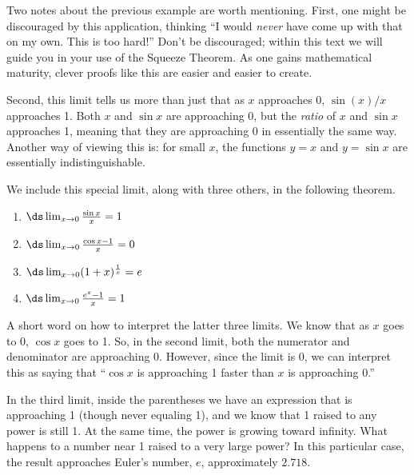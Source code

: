 Two notes about the previous example are worth mentioning. First, one might be discouraged by this application, thinking ``I would \emph{never} have come up with that on my own. This is too hard!'' Don't be discouraged; within this text we will guide you in your use of the Squeeze Theorem. As one gains mathematical maturity, clever proofs like this are easier and easier to create.

Second, this limit tells us more than just that as $x$ app\-roaches 0, $\sin(x)/x$ approaches 1. Both $x$ and $\sin x$ are approaching 0, but the \emph{ratio} of $x$ and $\sin x$ approaches 1, meaning that they are approaching 0 in essentially the same way. Another way of viewing this is: for small $x$, the functions $y=x$ and $y=\sin x$ are essentially indistinguishable.\bigskip

We include this special limit, along with three others, in the following theorem.

\begin{theorem}\label{thm:special_limits}
\mbox{}\vspace{-1.5\baselineskip}
\begin{multicols}{2}
\begin{enumerate}
	\item		$\ds \lim_{x\to 0} \frac{\sin x}{x} = 1$
	\item		$\ds \lim_{x\to 0} \frac{\cos x-1}{x} = 0$
	\item		$\ds \lim_{x\to 0} (1+x)^\frac1x = e$
	\item		$\ds \lim_{x\to 0} \frac{e^x-1}{x} = 1$
\end{enumerate}
\end{multicols}
\end{theorem}

A short word on how to interpret the latter three limits. We know that as $x$ goes to 0, $\cos x$ goes to 1. So, in the second limit, both the numerator and denominator are approaching 0. However, since the limit is 0, we can interpret this as saying that ``$\cos x$ is approaching 1 faster than $x$ is approaching 0.''

In the third limit, inside the parentheses we have an expression that is approaching 1 (though never equaling 1), and we know that 1 raised to any power is still 1. At the same time, the power is growing toward infinity. What happens to a number near 1 raised to a very large power? In this particular case, the result approaches Euler's number, $e$, approximately $2.718.$

